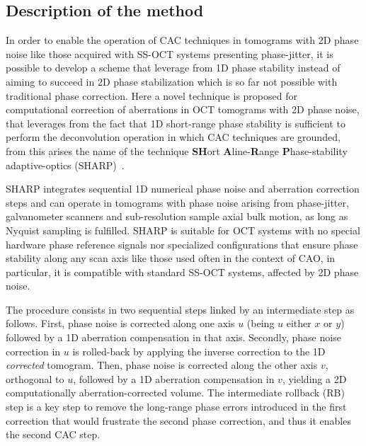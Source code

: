\subsection{Description of the method}

In order to enable the operation of CAC techniques in tomograms with 2D phase noise like those acquired with SS-OCT systems presenting phase-jitter, it is possible to develop a scheme that leverage from 1D phase stability instead of aiming to succeed in 2D phase stabilization which is so far not possible with traditional phase correction. Here a novel technique is proposed for computational correction of aberrations in OCT tomograms with 2D phase noise, that leverages from the fact that 1D short-range phase stability is sufficient to perform the deconvolution operation in which CAC techniques are grounded, from this arises the name of the technique \textbf{SH}ort \textbf{A}line-\textbf{R}ange \textbf{P}hase-stability adaptive-optics (SHARP)~\cite{Ruiz-Lopera2020_Computational}.

SHARP integrates sequential 1D numerical phase noise and aberration correction steps and can operate in tomograms with phase noise arising from phase-jitter, galvanometer scanners and sub-resolution sample axial bulk motion, as long as Nyquist sampling is fulfilled. SHARP is suitable for OCT systems with no special hardware phase reference signals nor specialized configurations that ensure phase stability along any scan axis like those used often in the context of CAO, in particular, it is compatible with standard SS-OCT systems, affected by 2D phase noise.

The procedure consists in two sequential steps linked by an intermediate step as follows. First, phase noise is corrected along one axis $u$ (being $u$ either $x$ or $y$) followed by a 1D aberration compensation in that axis. Secondly, phase noise correction in $u$ is rolled-back by applying the inverse correction to the 1D \emph{corrected} tomogram. Then, phase noise is corrected along the other axis $v$, orthogonal to $u$, followed by a 1D aberration compensation in $v$, yielding a 2D computationally aberration-corrected volume. The intermediate rollback (RB) step is a key step to remove the long-range phase errors introduced in the first correction that would frustrate the second phase correction, and thus it enables the second CAC step.

